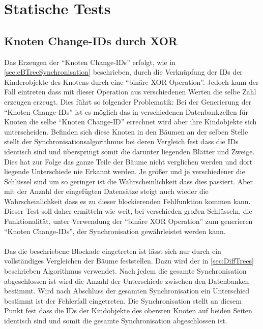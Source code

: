 \documentclass[a4paper,11pt,oneside,%
headsepline,												%
footsepline,												%
bibtotocnumbered									%
]{scrreprt}
\begin{document}
\newpage
\section{Statische Tests}
\subsection{Knoten Change-IDs durch XOR}
\label{sec:XorError}
Das Erzeugen der \enquote{Knoten Change-IDs} erfolgt, wie in \autoref{sec:eBTreeSynchronisation} beschrieben, durch die Verknüpfung der IDs der Kinderobjekte des Knotens durch eine \enquote{binäre XOR Operation}. Jedoch kann der Fall eintreten dass mit dieser Operation aus verschiedenen Werten die selbe Zahl erzeugen erzeugt. Dies führt so folgender Problematik: Bei der Generierung der \enquote{Knoten Change-IDs} ist es möglich das in verschiedenen Datenbankzellen für Knoten die selbe \enquote{Knoten Change-ID}  errechnet wird aber ihre Kindobjekte sich unterscheiden. Befinden sich diese Knoten in den Bäumen an der selben Stelle stellt der Synchronisationsalgorithmus bei deren Vergleich fest dass die IDs identisch sind und überspringt somit die darunter liegenden Blätter und Zweige. Dies hat zur Folge das ganze Teile der Bäume nicht verglichen werden und dort liegende Unterschiede nie Erkannt werden. Je größer und je verschiedener die Schlüssel sind um so geringer ist die Wahrscheinlichkeit dass dies passiert. Aber mit der Anzahl der eingefügten Datensätze steigt auch wieder die Wahrscheinlichkeit dass es zu dieser blockierenden Fehlfunktion kommen kann. Dieser Test soll daher ermitteln wie weit, bei verschieden großen Schlüsseln, die Funktionalität, unter Verwendung der \enquote{binäre XOR Operation} zum generieren \enquote{Knoten Change-IDs}, der Synchronisation gewährleistet werden kann.\\\\
Das die beschriebene Blockade eingetreten ist lässt sich nur durch ein vollständiges Vergleichen der Bäume feststellen. Dazu wird der in \autoref{sec:DiffTrees} beschrieben Algorithmus verwendet. Nach jedem die gesamte Synchronisation abgeschlossen ist wird die Anzahl der Unterschiede zwischen den Datenbanken bestimmt. Wird nach Abschluss der gesamten Synchronisation ein Unterschied bestimmt ist der Fehlerfall eingetreten. Die Synchronisation stellt an diesem Punkt fest dass die IDs der Kindobjekte des obersten Knoten auf beiden Seiten identisch sind und somit die gesamte Synchronisation abgeschlossen ist. \\\\
\end{document}
